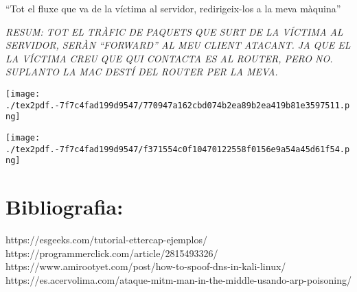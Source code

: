 \documentclass[]{article}
\begin{document}
``Tot el fluxe que va de la víctima al servidor, redirigeix-los a la
meva màquina''

\emph{RESUM: TOT EL TRÀFIC DE PAQUETS QUE SURT DE LA VÍCTIMA AL
SERVIDOR, SERÀN ``FORWARD'' AL MEU CLIENT ATACANT. JA QUE EL LA VÍCTIMA
CREU QUE QUI CONTACTA ES AL ROUTER, PERO NO. SUPLANTO LA MAC DESTÍ DEL
ROUTER PER LA MEVA.}

\texttt{[image: ./tex2pdf.-7f7c4fad199d9547/770947a162cbd074b2ea89b2ea419b81e3597511.png]}

\texttt{[image: ./tex2pdf.-7f7c4fad199d9547/f371554c0f10470122558f0156e9a54a45d61f54.png]}

\hypertarget{bibliografia}{%
\section{\texorpdfstring{\textbf{Bibliografia}:}{Bibliografia:}}\label{bibliografia}}

https://esgeeks.com/tutorial-ettercap-ejemplos/
https://programmerclick.com/article/2815493326/
https://www.amirootyet.com/post/how-to-spoof-dns-in-kali-linux/
https://es.acervolima.com/ataque-mitm-man-in-the-middle-usando-arp-poisoning/
\end{document}
